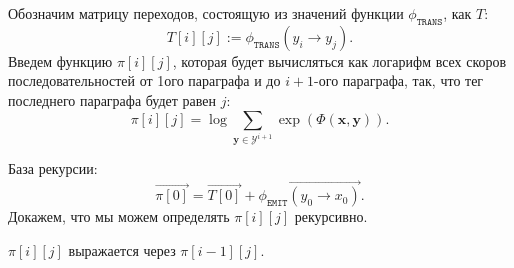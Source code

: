 Обозначим матрицу переходов, состоящую из значений функции $\phi_{\texttt{TRANS}}$, как $T$:
\begin{equation}
\label{matrix}
T[i][j] := \phi_{\texttt{TRANS}}(y_i \rightarrow y_j).
\end{equation}
Введем функцию $\pi[i][j]$, которая будет вычисляться как логарифм всех скоров последовательностей от 1ого параграфа и до $i + 1$-ого параграфа, так, что тег последнего параграфа будет равен $j$:
\begin{equation}
\label{pi}
\pi[i][j] = \log\sum\limits_{\mathbf{y} \in \mathcal{Y}^{i+1}} \exp(\Phi(\mathbf{x},\mathbf{y})).
\end{equation}

База рекурсии: 
\begin{equation}
\label{recursion_base}
\overrightarrow{\pi[0]} = \overrightarrow{T[0]} + \overrightarrow{\phi_{\texttt{EMIT}}(y_0 \rightarrow x_0)}.
\end{equation}
Докажем, что мы можем определять $\pi[i][j]$ рекурсивно.
\begin{proposition}
$\pi[i][j]$ выражается через $\pi[i - 1][j]$.
\end{proposition}

